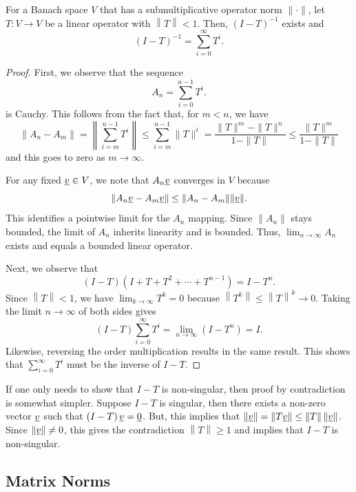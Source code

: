 \begin{theorem}
For a Banach space $V$ that has a submultiplicative operator norm $\| \cdot \|$, let $T \colon V \rightarrow V$ be a linear operator with $\left\| T \right\| < 1$.
Then, $(I-T)^{-1}$ exists and
\[ (I-T)^{-1} = \sum_{i=0}^{\infty} T^i. \]
\end{theorem}
\begin{proof}
First, we observe that the sequence
\[ A_n = \sum_{i=0}^{n-1} T^i.\]
is Cauchy.  This follows from the fact that, for $m<n$, we have
\[ \| A_n - A_m \| = \left\| \sum_{i=m}^{n-1} T^i \right\| \leq \sum_{i=m}^{n-1} \| T \|^i = \frac{\| T \|^m - \| T \|^n}{1 - \| T \|} \leq  \frac{\| T \|^m}{1 - \| T \|} \]
and this goes to zero as $m\rightarrow \infty$.

For any fixed $\underline{v}\in V$, we note that $A_n \underline{v}$ converges in $V$ because \[\| A_n \underline{v} - A_m \underline{v} \| \leq \| A_n - A_m \| \| \underline{v}\|. \]
This identifies a pointwise limit for the $A_n$ mapping.
Since $\| A_n \|$ stays bounded, the limit of $A_n$ inherits linearity and is bounded.
Thus, $\lim_{n\rightarrow \infty} A_n$ exists and equals a bounded linear operator.

Next, we observe that
\[ (I - T) \left( I + T + T^2 + \cdots + T^{n-1} \right) = I - T^n . \]
Since $\left\| T \right\| < 1$, we have $\lim_{k \rightarrow \infty} T^k = 0$ because $\left\| T^k \right\| \leq \left\| T \right\|^k \rightarrow 0$.
Taking the limit $n\rightarrow \infty$ of both sides gives
\[ (I - T) \sum_{i=0}^{\infty} T^i =  \lim_{n \rightarrow \infty} (I - T^n ) = I. \]
Likewise, reversing the order multiplication results in the same result.
This shows that $\sum_{i=0}^{\infty} T^i$ must be the inverse of $I -T$.
\end{proof}

If one only needs to show that $I - T$ is non-singular, then proof by contradiction is somewhat simpler.
Suppose $I - T$ is singular, then there exists a non-zero vector $\underline{v}$ such that $ \left( I - T \right) \underline{v} = \underline{0}$.
But, this implies that $\left\| \underline{v} \right\| = \left\| T \underline{v} \right\| \leq \left\| T \right\| \left\| \underline{v} \right\|$.
Since $\| \underline{v} \| \neq 0$, this gives the contradiction $\left\| T \right\| \geq 1$ and implies that $I-T$ is non-singular.

\subsection{Matrix Norms}

